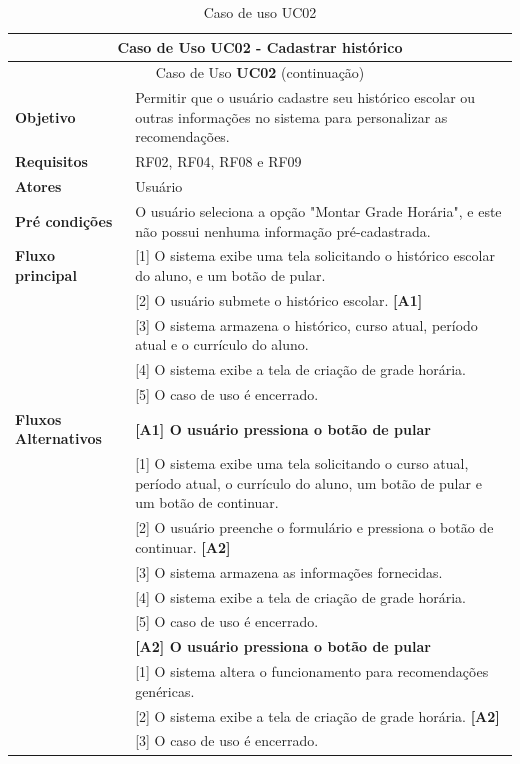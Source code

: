 \begin{longtable}{ | m{} | m{} | }
    
    \hline\hline    
    \multicolumn{2}{|c|}{Caso de Uso \textbf{UC02} - Cadastrar histórico}\tabularnewline\hline\hline\endfirsthead
    \hline\hline
    \multicolumn{2}{|c|}{Caso de Uso \textbf{UC02} (continuação)}\tabularnewline\hline\hline\endhead
    \hline\endfoot
    \hline\caption{Caso de uso UC02}\endlastfoot

    \textbf{Objetivo} & Permitir que o usuário cadastre seu histórico escolar ou outras informações no sistema para personalizar as recomendações.\tabularnewline\hline
    \textbf{Requisitos} & RF02, RF04, RF08 e RF09\tabularnewline\hline
    \textbf{Atores} & Usuário\tabularnewline\hline
    \textbf{Pré condições} & O usuário seleciona a opção "Montar Grade Horária", e este não possui nenhuma informação pré-cadastrada.\tabularnewline\hline

    \multirow{1}{*}{\textbf{Fluxo principal}} & [1] O sistema exibe uma tela solicitando o histórico escolar do aluno, e um botão de pular.\tabularnewline\cline{2-2}
    & [2] O usuário submete o histórico escolar. \textbf{[A1]}\tabularnewline\cline{2-2}
    & [3] O sistema armazena o histórico, curso atual, período atual e o currículo do aluno.\tabularnewline\cline{2-2}
    & [4] O sistema exibe a tela de criação de grade horária.\tabularnewline\cline{2-2}
    & [5] O caso de uso é encerrado.\tabularnewline\hline

    \multirow{1}{*}{\textbf{Fluxos Alternativos}} & \textbf{[A1] O usuário pressiona o botão de pular}\tabularnewline\cline{2-2}
    & [1] O sistema exibe uma tela solicitando o curso atual, período atual, o currículo do aluno, um botão de pular e um botão de continuar.\tabularnewline\cline{2-2}
    & [2] O usuário preenche o formulário e pressiona o botão de continuar. \textbf{[A2]}\tabularnewline\cline{2-2} 
    & [3] O sistema armazena as informações fornecidas.\tabularnewline\cline{2-2}
    & [4] O sistema exibe a tela de criação de grade horária.\tabularnewline\cline{2-2}
    & [5] O caso de uso é encerrado.\tabularnewline\cline{2-2}

    & \textbf{[A2] O usuário pressiona o botão de pular}\tabularnewline\cline{2-2}
    & [1] O sistema altera o funcionamento para recomendações genéricas.\tabularnewline\cline{2-2}
    & [2] O sistema exibe a tela de criação de grade horária. \textbf{[A2]}\tabularnewline\cline{2-2} 
    & [3] O caso de uso é encerrado. %
    \label{tab:uc02}
\end{longtable}


